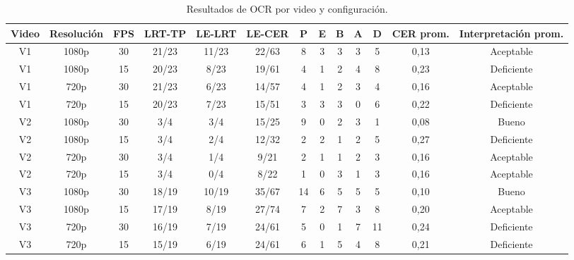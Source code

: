 \documentclass[runningheads]{llncs}
\begin{document}
\begin{table}[H]
\centering
\caption{Resultados de OCR por video y configuración.}
\begin{tabular}{|c|c|c|c|c|c|c|c|c|c|c|c|c|}
\hline
\rowcolor{gray!20}
\textbf{Video} & \textbf{Resolución} & \textbf{FPS} & \textbf{LRT-TP} & \textbf{LE-LRT} & \textbf{LE-CER} & \textbf{P} & \textbf{E} & \textbf{B} & \textbf{A} & \textbf{D} & \textbf{CER prom.} & \textbf{Interpretación prom.} \\
\hline
V1 & 1080p & 30 & 21/23 & 11/23 & 22/63 & 8 & 3 & 3 & 3 & 5 & 0,13 & Aceptable \\
\hline
V1 & 1080p & 15 & 20/23 & 8/23 & 19/61 & 4 & 1 & 2 & 4 & 8 & 0,23 & Deficiente \\
\hline
V1 & 720p  & 30 & 21/23 & 6/23 & 14/57 & 4 & 1 & 2 & 3 & 4 & 0,16 & Aceptable \\
\hline
V1 & 720p  & 15 & 20/23 & 7/23 & 15/51 & 3 & 3 & 3 & 0 & 6 & 0,22 & Deficiente \\
\hline
V2 & 1080p & 30 & 3/4 & 3/4 & 15/25 & 9 & 0 & 2 & 3 & 1 & 0,08 & Bueno \\
\hline
V2 & 1080p & 15 & 3/4 & 2/4 & 12/32 & 2 & 2 & 1 & 2 & 5 & 0,27 & Deficiente \\
\hline
V2 & 720p  & 30 & 3/4 & 1/4 & 9/21 & 2 & 1 & 1 & 2 & 3 & 0,16 & Aceptable \\
\hline
V2 & 720p  & 15 & 3/4 & 0/4 & 8/22 & 1 & 0 & 3 & 1 & 3 & 0,16 & Aceptable \\
\hline
V3 & 1080p & 30 & 18/19 & 10/19 & 35/67 & 14 & 6 & 5 & 5 & 5 & 0,10 & Bueno \\
\hline
V3 & 1080p & 15 & 17/19 & 8/19 & 27/74 & 7 & 2 & 7 & 3 & 8 & 0,20 & Aceptable \\
\hline
V3 & 720p  & 30 & 16/19 & 7/19 & 24/61 & 5 & 0 & 1 & 7 & 11 & 0,24 & Deficiente \\
\hline
V3 & 720p  & 15 & 15/19 & 6/19 & 24/61 & 6 & 1 & 5 & 4 & 8 & 0,21 & Deficiente \\
\hline
\end{tabular}
\label{tab:ocr}
\end{table}
\end{document}
